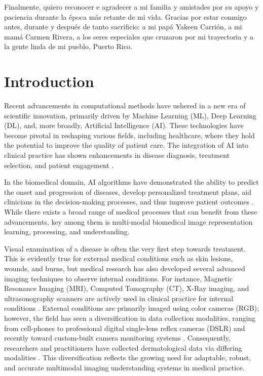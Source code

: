 \documentclass[11pt]{ucthesis}
\begin{document}
\begin{frontmatter}
\begin{acknowledgements}
Finalmente, quiero reconocer e agradecer a mi familia y amistades por su apoyo y paciencia durante la época más retante de mi vida. Gracias por estar conmigo antes, durante y después de tanto sacrificio: a mi papá Yakeen Carrión, a mi mamá Carmen Rivera, a los seres especiales que cruzaron por mi trayectoria y a la gente linda de mi pueblo, Puerto Rico.

\end{acknowledgements}

\end{frontmatter}

\chapter{Introduction}\label{section:intro}

Recent advancements in computational methods have ushered in a new era of scientific innovation, primarily driven by Machine Learning (ML), Deep Learning (DL), and, more broadly, Artificial Intelligence (AI). These technologies have become pivotal in reshaping various fields, including healthcare, where they hold the potential to improve the quality of patient care. The integration of AI into clinical practice has shown enhancements in disease diagnosis, treatment selection, and patient engagement \cite{Alowais2023RevolutionizingHT}.

In the biomedical domain, AI algorithms have demonstrated the ability to predict the onset and progression of diseases, develop personalized treatment plans, aid clinicians in the decision-making processes, and thus improve patient outcomes \cite{hema_2022, ahsan_2022, gopi_2020, Delpino2022MachineLF, Myszczynska2020ApplicationsOM}. While there exists a broad range of medical processes that can benefit from these advancements, key among them is multi-modal biomedical image representation learning, processing, and understanding.

Visual examination of a disease is often the very first step towards treatment. This is evidently true for external medical conditions such as skin lesions, wounds, and burns, but medical research has also developed several advanced imaging techniques to observe internal conditions. For instance, Magnetic Resonance Imaging (MRI), Computed Tomography (CT), X-Ray imaging, and ultrasonography scanners are actively used in clinical practice for internal conditions \cite{Hussain2022ModernDI, Li2020ImagingIC}. External conditions are primarily imaged using color cameras (RGB); however, the field has seen a diversification in data collection modalities, ranging from cell-phones to professional digital single-lens reflex cameras (DSLR) and recently toward custom-built camera monitoring systems \cite{Li2023ProgrammableDO}. Consequently, researchers and practitioners have collected dermatological data via differing modalities \cite{data_dryad}. This diversification reflects the growing need for adaptable, robust, and accurate multimodal imaging understanding systems in medical practice.
\end{document}
